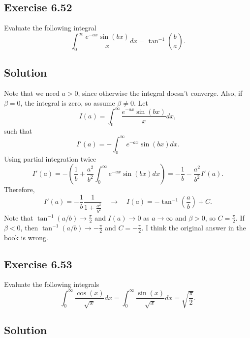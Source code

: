 \subsection*{Exercise 6.52}

Evaluate the following integral
\begin{equation*}
    \int_0^{\infty} \frac{e^{-a x} \sin(bx)}{x} dx = \tan^{-1} \left(\frac{b}{a}\right).
\end{equation*}

\subsection*{Solution}
Note that we need $a > 0$, since otherwise the integral doesn't converge.
Also, if $\beta = 0$, the integral is zero, so assume $\beta \neq 0$.
Let
\begin{equation*}
    I(a) = \int_0^{\infty} \frac{e^{-a x} \sin(bx)}{x} dx,
\end{equation*}
such that
\begin{equation*}
    I'(a) = - \int_0^{\infty} e^{-ax} \sin(b x) dx.
\end{equation*}
Using partial integration twice
\begin{equation*}
    I'(a) = -\left( \frac{1}{b} + \frac{a^2}{b^2} \int_0^{\infty} e^{-ax} \sin(bx) dx\right)
        = -\frac{1}{b} - \frac{a^2}{b^2} I'(a).
\end{equation*}
Therefore,
\begin{equation*}
    I'(a) = -\frac{1}{b} \frac{1}{1 + \frac{a^2}{b^2}}
        \quad \rightarrow \quad I(a) = -\tan^{-1}\left(\frac{a}{b}\right) + C.
\end{equation*}
Note that $\tan^{-1}(a/b) \to \frac{\pi}{2}$ and $I(a) \to 0$ as $a \to \infty$ and $\beta > 0$, so $C = \frac{\pi}{2}$.
If $\beta < 0$, then $\tan^{-1}(a/b) \to -\frac{\pi}{2}$ and $C = -\frac{\pi}{2}$.
I think the original answer in the book is wrong.


\subsection*{Exercise 6.53}

Evaluate the following integrals
\begin{equation*}
    \int_0^{\infty} \frac{\cos(x)}{\sqrt{x}} dx = \int_0^{\infty} \frac{\sin(x)}{\sqrt{x}} dx = \sqrt{\frac{\pi}{2}}.
\end{equation*}

\subsection*{Solution}

